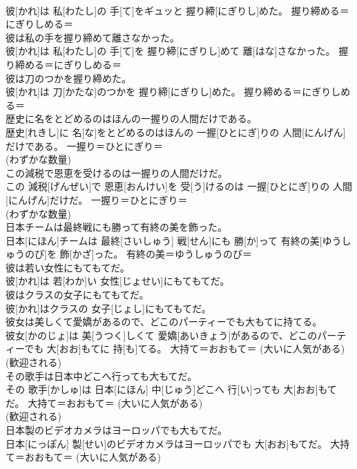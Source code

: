 \documentclass[8pt]{extreport}
\begin{document}
\begin{CJK}{UTF8}{min}
{\\	彼[かれ]は 私[わたし]の 手[て]をギュッと 握り締[にぎりし]めた。	握り締める＝にぎりしめる＝ 
\\	彼は私の手を握り締めて離さなかった。	
\\	彼[かれ]は 私[わたし]の 手[て]を 握り締[にぎりし]めて 離[はな]さなかった。	握り締める＝にぎりしめる＝ 
\\	彼は刀のつかを握り締めた。	
\\	彼[かれ]は 刀[かたな]のつかを 握り締[にぎりし]めた。	握り締める＝にぎりしめる＝ 
\\	歴史に名をとどめるのはほんの一握りの人間だけである。	
\\	歴史[れきし]に 名[な]をとどめるのはほんの 一握[ひとにぎ]りの 人間[にんげん]だけである。	一握り＝ひとにぎり＝ 
\\	(わずかな数量)
\\	この減税で恩恵を受けるのは一握りの人間だけだ。	
\\	この 減税[げんぜい]で 恩恵[おんけい]を 受[う]けるのは 一握[ひとにぎ]りの 人間[にんげん]だけだ。	一握り＝ひとにぎり＝ 
\\	(わずかな数量)
\\	日本チームは最終戦にも勝って有終の美を飾った。	
\\	日本[にほん]チームは 最終[さいしゅう] 戦[せん]にも 勝[か]って 有終の美[ゆうしゅうのび]を 飾[かざ]った。	有終の美＝ゆうしゅうのび＝ 
\\	彼は若い女性にもてもてだ。	
\\	彼[かれ]は 若[わか]い 女性[じょせい]にもてもてだ。	
\\	彼はクラスの女子にもてもてだ。	
\\	彼[かれ]はクラスの 女子[じょし]にもてもてだ。	
\\	彼女は美しくて愛嬌があるので、どこのパーティーでも大もてに持てる。	
\\	彼女[かのじょ]は 美[うつく]しくて 愛嬌[あいきょう]があるので、どこのパーティーでも 大[おお]もてに 持[も]てる。	大持て＝おおもて＝ (大いに人気がある) 
\\	(歓迎される) 
\\	その歌手は日本中どこへ行っても大もてだ。	
\\	その 歌手[かしゅ]は 日本[にほん] 中[じゅう]どこへ 行[い]っても 大[おお]もてだ。	大持て＝おおもて＝ (大いに人気がある) 
\\	(歓迎される) 
\\	日本製のビデオカメラはヨーロッパでも大もてだ。	
\\	日本[にっぽん] 製[せい]のビデオカメラはヨーロッパでも 大[おお]もてだ。	大持て＝おおもて＝ (大いに人気がある) 
}
\end{CJK}
\end{document}
